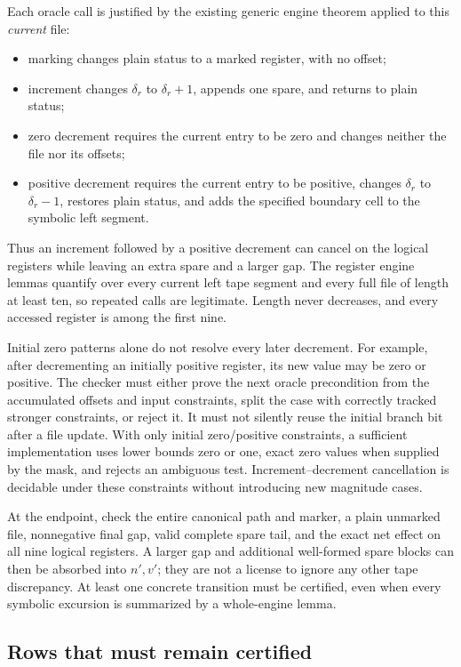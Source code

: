 Each oracle call is justified by the existing generic engine theorem
applied to this \emph{current} file:
\begin{itemize}
\item marking changes plain status to a marked register, with no offset;
\item increment changes $\delta_r$ to $\delta_r+1$, appends one spare,
and returns to plain status;
\item zero decrement requires the current entry to be zero and changes
neither the file nor its offsets;
\item positive decrement requires the current entry to be positive,
changes $\delta_r$ to $\delta_r-1$, restores plain status, and adds
the specified boundary cell to the symbolic left segment.
\end{itemize}
Thus an increment followed by a positive decrement can cancel on the
logical registers while leaving an extra spare and a larger gap.
The register engine lemmas quantify over every current left tape
segment and every full file of length at least ten, so repeated calls
are legitimate.  Length never decreases, and every accessed register
is among the first nine.

Initial zero patterns alone do not resolve every later decrement.
For example, after decrementing an initially positive register, its
new value may be zero or positive.  The checker must either prove the
next oracle precondition from the accumulated offsets and input
constraints, split the case with correctly tracked stronger
constraints, or reject it.  It must not silently reuse the initial
branch bit after a file update.  With only initial zero/positive
constraints, a sufficient implementation uses lower bounds zero or
one, exact zero values when supplied by the mask, and rejects an
ambiguous test.  Increment--decrement cancellation is decidable under
these constraints without introducing new magnitude cases.

At the endpoint, check the entire canonical path and marker, a plain
unmarked file, nonnegative final gap, valid complete spare tail, and
the exact net effect on all nine logical registers.  A larger gap and
additional well-formed spare blocks can then be absorbed into $n',v'$;
they are not a license to ignore any other tape discrepancy.  At least
one concrete transition must be certified, even when every symbolic
excursion is summarized by a whole-engine lemma.

\subsection{Rows that must remain certified}


